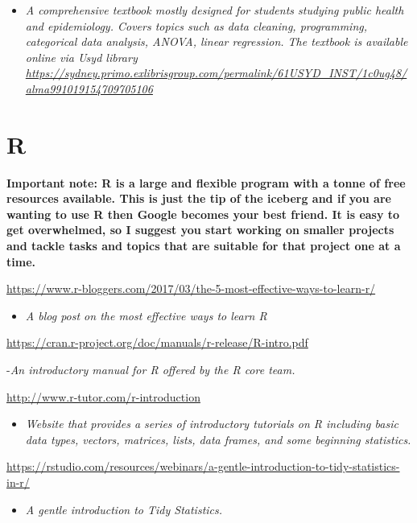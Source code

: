 \documentclass[
]{book}
\providecommand{\tightlist}{%
  \setlength{\itemsep}{0pt}\setlength{\parskip}{0pt}}
\begin{document}
\begin{itemize}
\tightlist
\item
  \emph{A comprehensive textbook mostly designed for students studying public health and epidemiology. Covers topics such as data cleaning, programming, categorical data analysis, ANOVA, linear regression. The textbook is available online via Usyd library \url{https://sydney.primo.exlibrisgroup.com/permalink/61USYD_INST/1c0ug48/alma991019154709705106}}
\end{itemize}

\section{R}\label{r}

\textbf{Important note: R is a large and flexible program with a tonne of free resources available. This is just the tip of the iceberg and if you are wanting to use R then Google becomes your best friend. It is easy to get overwhelmed, so I suggest you start working on smaller projects and tackle tasks and topics that are suitable for that project one at a time. }

\url{https://www.r-bloggers.com/2017/03/the-5-most-effective-ways-to-learn-r/}

\begin{itemize}
\tightlist
\item
  \emph{A blog post on the most effective ways to learn R}
\end{itemize}

\url{https://cran.r-project.org/doc/manuals/r-release/R-intro.pdf}

-\emph{An introductory manual for R offered by the R core team.}

\url{http://www.r-tutor.com/r-introduction}

\begin{itemize}
\tightlist
\item
  \emph{Website that provides a series of introductory tutorials on R including basic data types, vectors, matrices, lists, data frames, and some beginning statistics.}
\end{itemize}

\url{https://rstudio.com/resources/webinars/a-gentle-introduction-to-tidy-statistics-in-r/}

\begin{itemize}
\tightlist
\item
  \emph{A gentle introduction to Tidy Statistics.}
\end{itemize}
\end{document}
